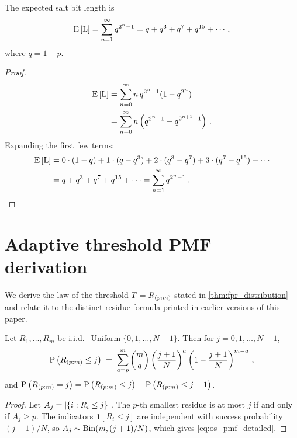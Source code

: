 \begin{theorem}
\label{thm:expected_size}
The expected salt bit length is
\begin{equation}
    \Expect{\RV{L}} = \sum_{n=1}^{\infty} q^{2^n - 1}
    = q + q^3 + q^7 + q^{15} + \cdots\,,
\end{equation}
where $q = 1 - p$.
\end{theorem}
\begin{proof}
\begin{align}
    \Expect{\RV{L}}
    &= \sum_{n=0}^{\infty} n\, q^{2^n - 1}(1 - q^{2^n}) \\
    &= \sum_{n=0}^{\infty} n\left(q^{2^n - 1} - q^{2^{n+1} - 1}\right)\,.
\end{align}
Expanding the first few terms:
\begin{align}
    \Expect{\RV{L}}
    &= 0 \cdot (1 - q) + 1 \cdot (q - q^3)
        + 2 \cdot (q^3 - q^7) + 3 \cdot (q^7 - q^{15}) + \cdots \\
    &= q + q^3 + q^7 + q^{15} + \cdots
    = \sum_{n=1}^{\infty} q^{2^n - 1}\,.
\end{align}
\end{proof}

\section{Adaptive threshold PMF derivation}
\label{sec:adaptive_pmf_derivation}

We derive the law of the threshold $T = R_{(p:m)}$ stated in
\cref{thm:fpr_distribution} and relate it to the distinct-residue formula
printed in earlier versions of this paper.

\begin{theorem}
\label{thm:os_pmf_detailed}
Let $R_1,\ldots,R_m$ be i.i.d.\ $\operatorname{Uniform}\{0,1,\ldots,N-1\}$.
Then for $j = 0, 1, \ldots, N-1$,
\begin{equation}
\label{eq:os_pmf_detailed}
    \Prob{\OS{p}{m} \leq j}
    \;=\; \sum_{a=p}^{m} \binom{m}{a}
    \left(\frac{j+1}{N}\right)^{a}\left(1 - \frac{j+1}{N}\right)^{m-a}\,,
\end{equation}
and $\Prob{\OS{p}{m} = j} = \Prob{\OS{p}{m} \leq j} - \Prob{\OS{p}{m} \leq j-1}$.
\end{theorem}
\begin{proof}
Let $A_j = \lvert\{i : R_i \leq j\}\rvert$.
The $p$-th smallest residue is at most $j$ if and only if $A_j \geq p$.
The indicators $\mathbf{1}[R_i \leq j]$ are independent with success
probability $(j+1)/N$, so $A_j \sim \mathrm{Bin}(m, (j+1)/N)$, which gives
\cref{eq:os_pmf_detailed}.
\end{proof}

